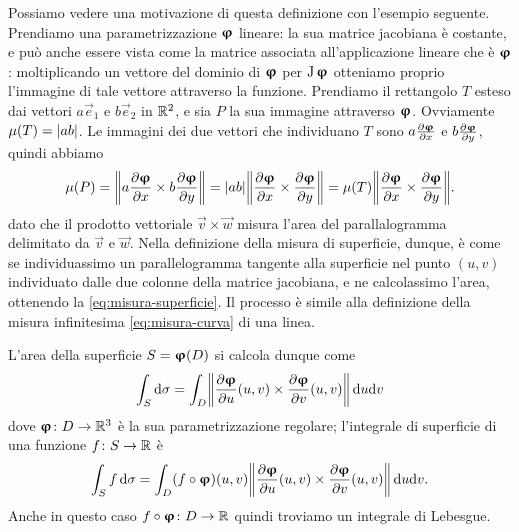 Possiamo vedere una motivazione di questa definizione con l'esempio seguente.
Prendiamo una parametrizzazione $\vphi$ lineare: la sua matrice jacobiana è costante, e può anche essere vista come la matrice associata all'applicazione lineare che è $\vphi$: moltiplicando un vettore del dominio di $\vphi$ per $\jac{\vphi}$ otteniamo proprio l'immagine di tale vettore attraverso la funzione.
Prendiamo il rettangolo $T$ esteso dai vettori $a\vec e_1$ e $b\vec e_2$ in $\R^2$, e sia $P$ la sua immagine attraverso $\vphi$.
Ovviamente $\mu(T)=\abs{ab}$.
Le immagini dei due vettori che individuano $T$ sono $a\drp{\vphi}{x}$ e $b\drp{\vphi}{y}$, quindi abbiamo
\begin{equation*}
	\mu(P)=\norm[\bigg]{a\drp{\vphi}{x}\times b\drp{\vphi}{y}}=\abs{ab}\norm[\bigg]{\drp{\vphi}{x}\times\drp{\vphi}{y}}=\mu(T)\norm[\bigg]{\drp{\vphi}{x}\times\drp{\vphi}{y}}.
\end{equation*}
dato che il prodotto vettoriale $\vec v\times\vec w$ misura l'area del parallalogramma delimitato da $\vec v$ e $\vec w$.
Nella definizione della misura di superficie, dunque, è come se individuassimo un parallelogramma tangente alla superficie nel punto $(u,v)$ individuato dalle due colonne della matrice jacobiana, e ne calcolassimo l'area, ottenendo la \eqref{eq:misura-superficie}.
Il processo è simile alla definizione della misura infinitesima \eqref{eq:misura-curva} di una linea.

L'area della superficie $S=\vphi(D)$ si calcola dunque come
\begin{equation}
	\int_S\dd\sigma=\int_D\norm[\bigg]{\drp{\vphi}{u}(u,v)\times\drp{\vphi}{v}(u,v)}\,\dd u\dd v
\end{equation}
dove $\vphi\colon D\to\R^3$ è la sua parametrizzazione regolare; l'integrale di superficie di una funzione $f\colon S\to\R$ è
\begin{equation}
	\int_Sf\,\dd\sigma=\int_D(f\circ\vphi)(u,v)\norm[\bigg]{\drp{\vphi}{u}(u,v)\times\drp{\vphi}{v}(u,v)}\,\dd u\dd v.
\end{equation}
Anche in questo caso $f\circ\vphi\colon D\to\R$ quindi troviamo un integrale di Lebesgue.

